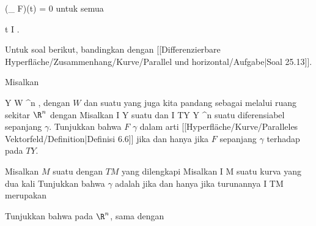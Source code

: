 \mavergleichskettedisp
{\vergleichskette
{ (\nabla_{\partial} F)(t)
}
{ =} { 0
}
{ } {
}
{ } {
}
{ } {
}
}
{}{}{}
untuk semua

\mavergleichskette
{\vergleichskette
{ t
}
{ \in }{ I
}
{  }{
}
{    }{
}
{   }{
}
}
{}{}{.}

Untuk soal berikut, bandingkan dengan
[[Differenzierbare Hyperfläche/Zusammenhang/Kurve/Parallel und horizontal/Aufgabe|Soal 25.13]].

{}
{

Misalkan

\mavergleichskette
{\vergleichskette
{ Y
}
{ \subseteq }{ W
}
{ \subseteq }{ \R^n
}
{    }{
}
{   }{
}
}
{}{}{,}
dengan $W$
dan suatu
yang juga kita pandang sebagai
melalui ruang sekitar $\R^n$ dengan
Misalkan
\maabb {\gamma} { I } { Y
} {}
suatu
dan
 { I } { TY \subseteq Y \times \R^n
} {}
suatu
diferensiabel sepanjang $\gamma$. Tunjukkan bahwa $F$
$\gamma$ dalam arti
[[Hyperfläche/Kurve/Paralleles Vektorfeld/Definition|Definisi 6.6]]
jika dan hanya jika $F$
sepanjang $\gamma$ terhadap
pada $TY$.

}
{} {}

{}
{

Misalkan $M$ suatu
dengan
$TM$ yang dilengkapi
Misalkan
\maabb {\gamma} { I } { M
} {}
suatu kurva yang dua kali
Tunjukkan bahwa $\gamma$ adalah
jika dan hanya jika turunannya
 { I } { TM
} {}
merupakan

}
{} {}

{}
{

Tunjukkan bahwa pada
$\R^n$, 
sama dengan

}
{} {}


